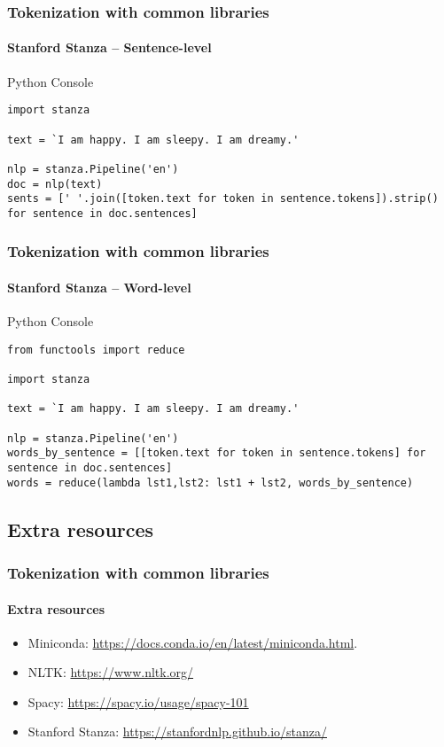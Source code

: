 \documentclass{beamer}
\begin{document}
\begin{frame}[containsverbatim]
    \frametitle{Tokenization with common libraries}
    \framesubtitle{Stanford Stanza -- Sentence-level}
    \begin{block}{Python Console}
        \begin{lstlisting}
import stanza

text = `I am happy. I am sleepy. I am dreamy.'

nlp = stanza.Pipeline('en')
doc = nlp(text)
sents = [' '.join([token.text for token in sentence.tokens]).strip() for sentence in doc.sentences]
        \end{lstlisting}    
    \end{block}

\end{frame}

\begin{frame}[containsverbatim]
    \frametitle{Tokenization with common libraries}
    \framesubtitle{Stanford Stanza -- Word-level}
    \begin{block}{Python Console}
        \begin{lstlisting}
from functools import reduce

import stanza

text = `I am happy. I am sleepy. I am dreamy.'

nlp = stanza.Pipeline('en')
words_by_sentence = [[token.text for token in sentence.tokens] for sentence in doc.sentences]
words = reduce(lambda lst1,lst2: lst1 + lst2, words_by_sentence)

        \end{lstlisting}    
    \end{block}
\end{frame}

\subsection{Extra resources}
\begin{frame}
    \frametitle{Tokenization with common libraries}
    \framesubtitle{Extra resources}
    \begin{itemize}
        \item Miniconda: \href{https://docs.conda.io/en/latest/miniconda.html}{https://docs.conda.io/en/latest/miniconda.html}.
        \item NLTK: \href{https://www.nltk.org/}{https://www.nltk.org/}
        \item Spacy: \href{https://spacy.io/usage/spacy-101}{https://spacy.io/usage/spacy-101}
        \item Stanford Stanza: \href{https://stanfordnlp.github.io/stanza/}{https://stanfordnlp.github.io/stanza/}
    \end{itemize}
\end{frame}
\end{document}
